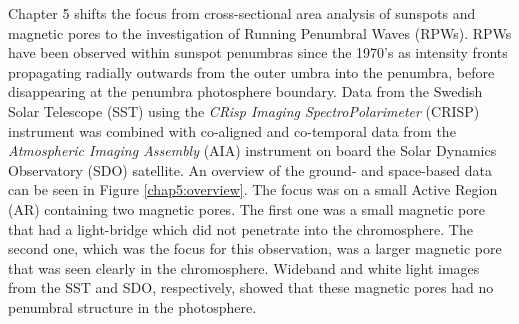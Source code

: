     Chapter 5 shifts the focus from cross-sectional area analysis of sunspots and magnetic pores to the investigation of Running Penumbral Waves (RPWs).
    RPWs have been observed within sunspot penumbras since the 1970's as intensity fronts propagating radially outwards from the outer umbra into the penumbra, before disappearing at the penumbra photosphere boundary.
    Data from the Swedish Solar Telescope (SST) using the \textit{CRisp Imaging SpectroPolarimeter} (CRISP) instrument was combined with co-aligned and co-temporal data from the \textit{Atmospheric Imaging Assembly} (AIA) instrument on board the Solar Dynamics Observatory (SDO) satellite.
    An overview of the ground- and space-based data can be seen in Figure \ref{chap5:overview}.
    The focus was on a small Active Region (AR) containing two magnetic pores.
    The first one was a small magnetic pore that had a light-bridge which did not penetrate into the chromosphere.
    The second one, which was the focus for this observation, was a larger magnetic pore that was seen clearly in the chromosphere. 
    Wideband and white light images from the SST and SDO, respectively, showed that these magnetic pores had no penumbral structure in the photosphere.
    
